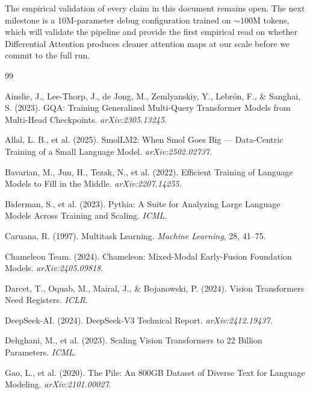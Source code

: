 \documentclass[11pt,a4paper]{article}
\theoremstyle{definition}
\theoremstyle{remark}
\begin{document}
The empirical validation of every claim in this document remains open.
The next milestone is a 10M-parameter debug configuration trained on
$\sim 100$M tokens, which will validate the pipeline and provide the first
empirical read on whether Differential Attention produces cleaner
attention maps at our scale before we commit to the full run.

\begin{thebibliography}{99}
\small

Ainslie, J., Lee-Thorp, J., de Jong, M., Zemlyanskiy, Y., Lebr\'on, F., \&
Sanghai, S. (2023). GQA: Training Generalized Multi-Query Transformer
Models from Multi-Head Checkpoints. \emph{arXiv:2305.13245}.

Allal, L. B., et al. (2025). SmolLM2: When Smol Goes Big --- Data-Centric
Training of a Small Language Model. \emph{arXiv:2502.02737}.

Bavarian, M., Jun, H., Tezak, N., et al. (2022). Efficient Training of
Language Models to Fill in the Middle. \emph{arXiv:2207.14255}.

Biderman, S., et al. (2023). Pythia: A Suite for Analyzing Large Language
Models Across Training and Scaling. \emph{ICML}.

Caruana, R. (1997). Multitask Learning. \emph{Machine Learning}, 28, 41--75.

Chameleon Team. (2024). Chameleon: Mixed-Modal Early-Fusion Foundation
Models. \emph{arXiv:2405.09818}.

Darcet, T., Oquab, M., Mairal, J., \& Bojanowski, P. (2024). Vision
Transformers Need Registers. \emph{ICLR}.

DeepSeek-AI. (2024). DeepSeek-V3 Technical Report.
\emph{arXiv:2412.19437}.

Dehghani, M., et al. (2023). Scaling Vision Transformers to 22 Billion
Parameters. \emph{ICML}.

Gao, L., et al. (2020). The Pile: An 800GB Dataset of Diverse Text for
Language Modeling. \emph{arXiv:2101.00027}.


\end{thebibliography}
\end{document}
